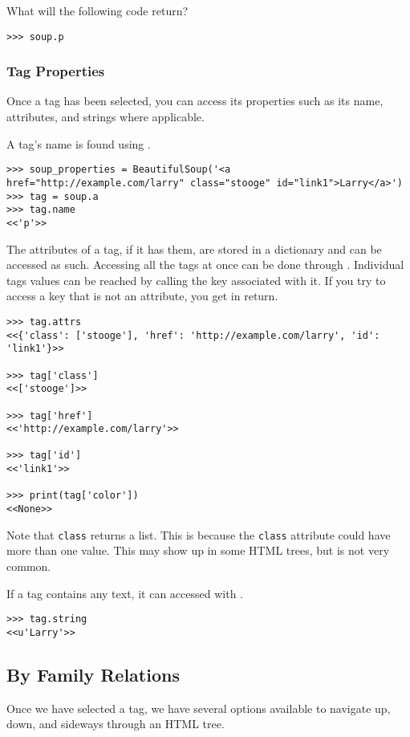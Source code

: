 \begin{problem}
What will the following code return?
\begin{lstlisting}
>>> soup.p
\end{lstlisting}
\end{problem}

\subsubsection{Tag Properties}

Once a tag has been selected, you can access its properties such as its name, attributes, and strings where applicable.

A tag's name is found using .
\begin{lstlisting}
>>> soup_properties = BeautifulSoup('<a href="http://example.com/larry" class="stooge" id="link1">Larry</a>')
>>> tag = soup.a
>>> tag.name
<<'p'>>
\end{lstlisting}

The attributes of a tag, if it has them, are stored in a dictionary and can be accessed as such.
Accessing all the tags at once can be done through .
Individual tags values can be reached by calling the key associated with it.
If you try to access a key that is not an attribute, you get  in return.
\begin{lstlisting}
>>> tag.attrs
<<{'class': ['stooge'], 'href': 'http://example.com/larry', 'id': 'link1'}>>

>>> tag['class']
<<['stooge']>>

>>> tag['href']
<<'http://example.com/larry'>>

>>> tag['id']
<<'link1'>>

>>> print(tag['color'])
<<None>>
\end{lstlisting}
Note that \lstinline{class} returns a list.
This is because the \lstinline{class} attribute could have more than one value.
This may show up in some HTML trees, but is not very common.

If a tag contains any text, it can accessed with .
\begin{lstlisting}
>>> tag.string
<<u'Larry'>>
\end{lstlisting}

\subsection*{By Family Relations}

Once we have selected a tag, we have several options available to navigate up, down, and sideways through an HTML tree.

